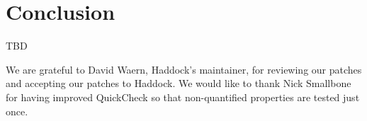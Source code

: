 \documentclass[preprint]{sigplanconf}
\begin{document}
\section{Conclusion}

TBD

\acks

We are grateful to David Waern, Haddock's maintainer, for reviewing our patches
and accepting our patches to Haddock.
We would like to thank
Nick Smallbone for having improved QuickCheck so that
non-quantified properties are tested just once.




\end{document}
